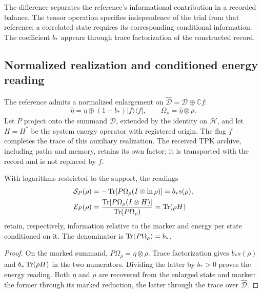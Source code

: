 The difference separates the reference's informational contribution in
a recorded balance. The tensor operation specifies independence of the
trial from that reference; a correlated state requires its corresponding
conditional information. The coefficient $b_*$ appears through trace
factorization of the constructed record.

\subsection{Normalized realization and conditioned energy reading}
\label{subsec:ii-ter27-flag}

The reference admits a normalized enlargement on
$\widehat{\mathcal D}=\mathcal D\oplus\mathbb C f$:
\begin{equation}
 \widehat\eta=\eta\oplus(1-b_*)|f\rangle\langle f|,
 \qquad \Omega_\rho=\widehat\eta\otimes\rho.
 \label{eq:ii-ter27-flag}
\end{equation}
Let $P$ project onto the summand $\mathcal D$, extended by the identity
on $\mathcal H$, and let $H=H^*$ be the system energy operator with
registered origin. The flag $f$ completes the trace of this auxiliary
realization. The received TPK archive, including paths and memory,
retains its own factor; it is transported with the record and is not
replaced by $f$.

\begin{proposition}
\label{prop:ii-ter27-readers}
With logarithms restricted to the support, the readings
\begin{align}
 \mathcal S_P(\rho)&=-\operatorname{Tr}[P\Omega_\rho(I\otimes\ln\rho)]
                    =b_*s(\rho),\label{eq:ii-ter27-S}\\
 \mathcal E_P(\rho)&=
 \frac{\operatorname{Tr}[P\Omega_\rho(I\otimes H)]}{\operatorname{Tr}(P\Omega_\rho)}
                    =\operatorname{Tr}(\rho H)\label{eq:ii-ter27-E}
\end{align}
retain, respectively, information relative to the marker and energy per
state conditioned on it. The denominator is $\operatorname{Tr}(P\Omega_\rho)=b_*$.
\end{proposition}
\begin{proof}
On the marked summand, $P\Omega_\rho=\eta\otimes\rho$.
Trace factorization gives $b_*s(\rho)$ and $b_*\operatorname{Tr}(\rho H)$
in the two numerators. Dividing the latter by $b_*>0$ proves the energy
reading. Both $\eta$ and $\rho$ are recovered from the enlarged state
and marker: the former through its marked reduction, the latter through
the trace over $\widehat{\mathcal D}$.
\end{proof}

